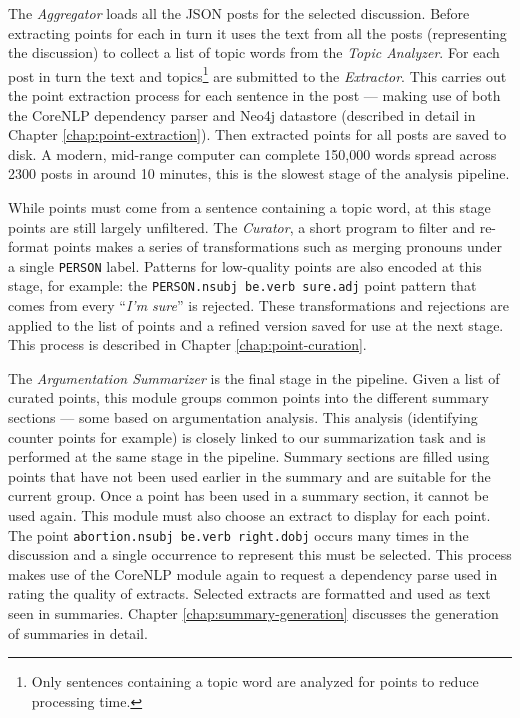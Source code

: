   The \textit{Aggregator} loads all the JSON posts for the selected discussion. Before extracting points for each in turn it uses the text from all the posts (representing the discussion) to collect a list of topic words from the \textit{Topic Analyzer}. For each post in turn the text and topics\footnote{Only sentences containing a topic word are analyzed for points to reduce processing time.} are submitted to the \textit{Extractor}. This carries out the point extraction process for each sentence in the post --- making use of both the CoreNLP dependency parser and Neo4j datastore (described in detail in Chapter \ref{chap:point-extraction}). Then extracted points for all posts are saved to disk. A modern, mid-range computer can complete 150,000 words spread across 2300 posts in around 10 minutes, this is the slowest stage of the analysis pipeline.

  While points must come from a sentence containing a topic word, at this stage points are still largely unfiltered. The \textit{Curator}, a short program to filter and re-format points makes a series of transformations such as merging pronouns under a single \texttt{PERSON} label. Patterns for low-quality points are also encoded at this stage, for example: the \texttt{PERSON.nsubj be.verb sure.adj} point pattern that comes from every ``\textit{I'm sure}'' is rejected. These transformations and rejections are applied to the list of points and a refined version saved for use at the next stage. This process is described in Chapter \ref{chap:point-curation}.

  The \textit{Argumentation Summarizer} is the final stage in the pipeline. Given a list of curated points, this module groups common points into the different summary sections --- some based on argumentation analysis. This analysis (identifying counter points for example) is closely linked to our summarization task and is performed at the same stage in the pipeline. Summary sections are filled using points that have not been used earlier in the summary and are suitable for the current group. Once a point has been used in a summary section, it cannot be used again. This module must also choose an extract to display for each point. The point \texttt{abortion.nsubj be.verb right.dobj} occurs many times in the discussion and a single occurrence to represent this must be selected. This process makes use of the CoreNLP module again to request a dependency parse used in rating the quality of extracts. Selected extracts are formatted and used as text seen in summaries. Chapter \ref{chap:summary-generation} discusses the generation of summaries in detail.

